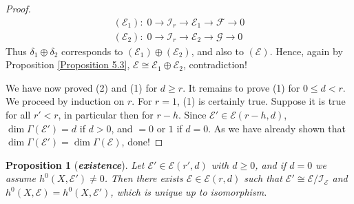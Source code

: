 \documentclass{ctexart}
\newtheorem{proposition}{Proposition}[section]
\begin{document}
\begin{proof}
    \begin{equation}
        \begin{split}
            (\mathcal{E}_{1}):\; 0 \longrightarrow \mathcal{I}_{r} \longrightarrow \mathcal{E}_{1} \longrightarrow \mathcal{F} \longrightarrow 0 \\
            (\mathcal{E}_{2}):\; 0 \longrightarrow \mathcal{I}_{r} \longrightarrow \mathcal{E}_{2} \longrightarrow \mathcal{G} \longrightarrow 0
        \end{split}
    \end{equation}
    Thus $\delta_{1} \oplus \delta_{2}$ corresponds to $(\mathcal{E}_{1}) \oplus (\mathcal{E}_{2})$, and also to $(\mathcal{E})$.
    Hence, again by Proposition \ref{Proposition 5.3}, $\mathcal{E} \cong \mathcal{E}_{1} \oplus \mathcal{E}_{2}$, contradiction!
    \par
    We have now proved (2) and (1) for $d \ge r$.
    It remains to prove (1) for $0 \le d < r$.
    We proceed by induction on $r$. 
    For $r = 1$, (1) is certainly true.
    Suppose it is true for all $r' < r$, in particular then for $r - h$.
    Since $\mathcal{E}' \in \mathcal{E}(r - h, d)$, $\dim \Gamma(\mathcal{E}') = d$ if $d > 0$, and $= 0$ or $1$ if $d = 0$.
    As we have already shown that $\dim \Gamma(\mathcal{E}') = \dim \Gamma(\mathcal{E})$, done!
\end{proof}
\begin{proposition}[\textbf{\emph{existence}}]
    Let $\mathcal{E}'\in \mathcal{E}(r', d)$ with $d \ge 0$, and if $d = 0$ we assume $h^0(X, \mathcal{E}') \neq 0$.
    Then there exists $\mathcal{E}\in \mathcal{E}(r, d)$ such that $\mathcal{E}' \cong \mathcal{E}/\mathcal{I}_{\mathcal{E}}$ and $h^{0}(X, \mathcal{E}) = h^{0}(X, \mathcal{E}')$,
    which is unique up to isomorphism.
    \label{Proposition 5.5}
\end{proposition}
\end{document}
